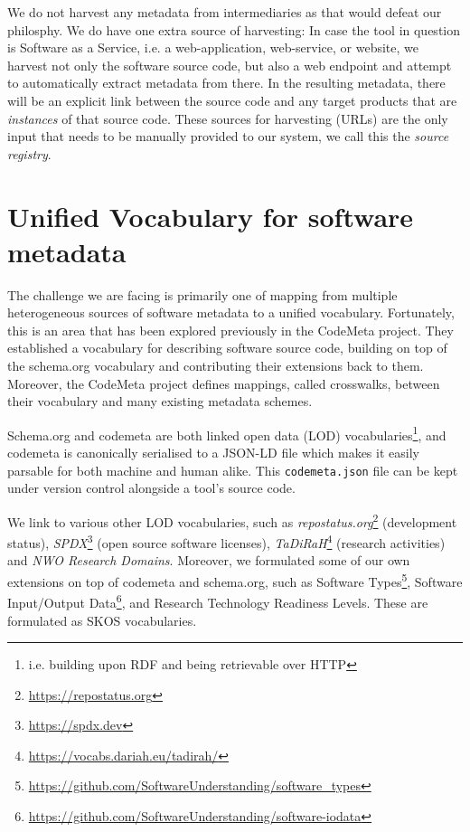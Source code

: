 \documentclass[a4paper,11pt]{article}
\begin{document}
We do not harvest any metadata from intermediaries as that would defeat our
philosphy. We do have one extra source of harvesting: In case the tool in
question is Software as a Service, i.e. a web-application, web-service, or
website, we harvest not only the software source code, but also a web endpoint
and attempt to automatically extract metadata from there. In the resulting
metadata, there will be an explicit link between the source code and any target
products that are \emph{instances} of that source code. These sources for
harvesting (URLs) are the only input that needs to be manually provided to our
system, we call this the \emph{source registry}. 

\section{Unified Vocabulary for software metadata}

The challenge we are facing is primarily one of mapping from multiple heterogeneous
sources of software metadata to a unified vocabulary. Fortunately, this is an area that
has been explored previously in the CodeMeta project. They established a
vocabulary for describing software source code, building on top of the
schema.org vocabulary and contributing their extensions back to them. Moreover,
the CodeMeta project defines mappings, called crosswalks, between their
vocabulary and many existing metadata schemes. 

Schema.org and codemeta are both linked open data (LOD) vocabularies\footnote{i.e.
building upon RDF and being retrievable over HTTP}, and codemeta is canonically
serialised to a JSON-LD file which makes it easily parsable for both machine
and human alike. This \texttt{codemeta.json} file can be kept under version
control alongside a tool's source code. 

We link to various other LOD vocabularies, such as
\emph{repostatus.org}\footnote{\url{https://repostatus.org}} (development
status), \emph{SPDX}\footnote{\url{https://spdx.dev}} (open source software
licenses), \emph{TaDiRaH}\footnote{\url{https://vocabs.dariah.eu/tadirah/}}
(research activities) and \emph{NWO Research Domains}. Moreover, we
formulated some of our own extensions on top of codemeta and schema.org, such
as Software
Types\footnote{\url{https://github.com/SoftwareUnderstanding/software_types}},
Software Input/Output
Data\footnote{\url{https://github.com/SoftwareUnderstanding/software-iodata}},
and Research Technology Readiness Levels. These are formulated as SKOS
vocabularies.
\end{document}
